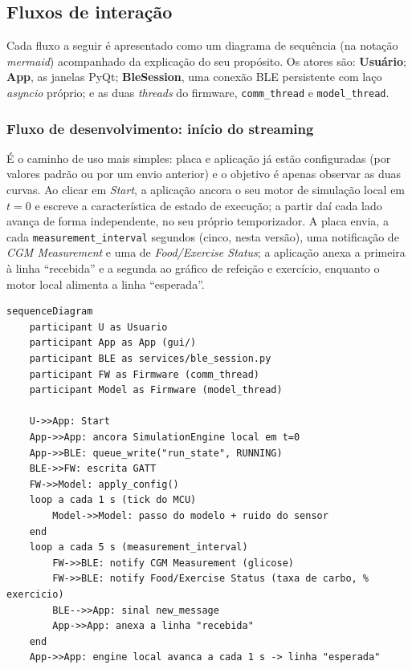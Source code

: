 \subsection{Fluxos de interação}
\label{sec:fluxos}

Cada fluxo a seguir é apresentado como um diagrama de sequência (na notação
\textit{mermaid}) acompanhado da explicação do seu propósito. Os atores são:
\textbf{Usuário}; \textbf{App}, as janelas PyQt; \textbf{BleSession}, uma
conexão BLE persistente com laço \textit{asyncio} próprio; e as duas
\textit{threads} do firmware, \texttt{comm\_thread} e \texttt{model\_thread}.

\subsubsection{Fluxo de desenvolvimento: início do streaming}
\label{sec:fluxo-dev}

É o caminho de uso mais simples: placa e aplicação já estão configuradas (por
valores padrão ou por um envio anterior) e o objetivo é apenas observar as
duas curvas. Ao clicar em \emph{Start}, a aplicação ancora o seu motor de
simulação local em $t = 0$ e escreve a característica de estado de execução;
a partir daí cada lado avança de forma independente, no seu próprio
temporizador. A placa envia, a cada \texttt{measurement\_interval} segundos
(cinco, nesta versão), uma notificação de \textit{CGM Measurement} e uma de
\textit{Food/Exercise Status}; a aplicação anexa a primeira à linha
``recebida'' e a segunda ao gráfico de refeição e exercício, enquanto o motor
local alimenta a linha ``esperada''.

\begin{lstlisting}[language=mermaid,caption={Fluxo de desenvolvimento: do clique em Start ao streaming contínuo.},label={lst:fluxo-dev}]
sequenceDiagram
    participant U as Usuario
    participant App as App (gui/)
    participant BLE as services/ble_session.py
    participant FW as Firmware (comm_thread)
    participant Model as Firmware (model_thread)

    U->>App: Start
    App->>App: ancora SimulationEngine local em t=0
    App->>BLE: queue_write("run_state", RUNNING)
    BLE->>FW: escrita GATT
    FW->>Model: apply_config()
    loop a cada 1 s (tick do MCU)
        Model->>Model: passo do modelo + ruido do sensor
    end
    loop a cada 5 s (measurement_interval)
        FW->>BLE: notify CGM Measurement (glicose)
        FW->>BLE: notify Food/Exercise Status (taxa de carbo, % exercicio)
        BLE-->>App: sinal new_message
        App->>App: anexa a linha "recebida"
    end
    App->>App: engine local avanca a cada 1 s -> linha "esperada"
\end{lstlisting}

